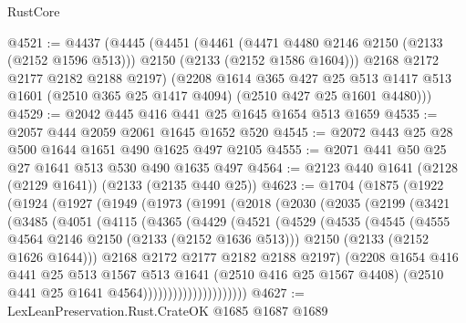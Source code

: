 \begin{lexlean}{RustCore}
\begin{coremodule}
@4521 := @4437
    (@4445
      (@4451
        (@4461
          (@4471 @4480 @2146 @2150 (@2133 (@2152 @1596 @513)))
          @2150
          (@2133 (@2152 @1586 @1604)))
        @2168
        @2172
        @2177
        @2182
        @2188
        @2197)
      (@2208
        @1614
        @365
        @427
        @25
        @513
        @1417
        @513
        @1601
        (@2510 @365 @25 @1417 @4094)
        (@2510 @427 @25 @1601 @4480)))
@4529 := @2042 @445 @416 @441 @25 @1645 @1654 @513 @1659
@4535 := @2057 @444 @2059 @2061 @1645 @1652 @520
@4545 := @2072 @443 @25 @28 @500 @1644 @1651 @490 @1625 @497 @2105
@4555 := @2071 @441 @50 @25 @27 @1641 @513 @530 @490 @1635 @497
@4564 := @2123 @440 @1641 (@2128 (@2129 @1641)) (@2133 (@2135 @440 @25))
@4623 := @1704
    (@1875
      (@1922
        (@1924
          (@1927
            (@1949
              (@1973
                (@1991
                  (@2018
                    (@2030
                      (@2035
                        (@2199
                          (@3421
                            (@3485
                              (@4051
                                (@4115
                                  (@4365
                                    (@4429
                                      (@4521
                                        (@4529
                                          (@4535
                                            (@4545
                                              (@4555 @4564 @2146 @2150 (@2133 (@2152 @1636 @513)))
                                              @2150
                                              (@2133 (@2152 @1626 @1644)))
                                            @2168
                                            @2172
                                            @2177
                                            @2182
                                            @2188
                                            @2197)
                                          (@2208
                                            @1654
                                            @416
                                            @441
                                            @25
                                            @513
                                            @1567
                                            @513
                                            @1641
                                            (@2510 @416 @25 @1567 @4408)
                                            (@2510 @441 @25 @1641 @4564)))))))))))))))))))))
@4627 := LexLeanPreservation.Rust.CrateOK @1685 @1687 @1689

\end{coremodule}
\end{lexlean}
